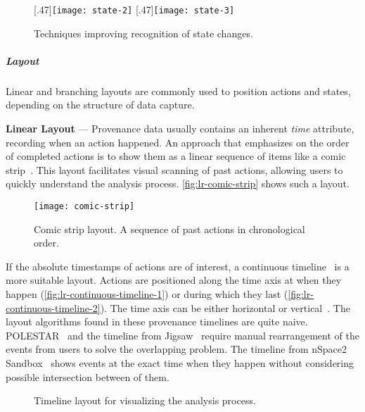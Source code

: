 \begin{figure}[!htb]
\centering
{}[.47\columnwidth]{\texttt{[image: state-2]}} 
\hfill
{}[.47\columnwidth]{\texttt{[image: state-3]}}
\caption{Techniques improving recognition of state changes.}
\end{figure}

\subparagraph{Layout} Linear and branching layouts are commonly used to position actions and states, depending on the structure of data capture.

\textbf{Linear Layout} --- Provenance data usually contains an inherent \emph{time} attribute, recording when an action happened. An approach that emphasizes on the order of completed actions is to show them as a linear sequence of items like a comic strip~\cite{Kurlander1988,Meng1998}. This layout facilitates visual scanning of past actions, allowing users to quickly understand the analysis process. \autoref{fig:lr-comic-strip} shows such a layout.

\begin{figure}[!htb]
	\centering
	\texttt{[image: comic-strip]}
	\caption{Comic strip layout. A sequence of past actions in chronological order. }
	\label{fig:lr-comic-strip}
\end{figure}

If the absolute timestamps of actions are of interest, a continuous timeline~\cite{Derthick2001} is a more suitable layout. Actions are positioned along the time axis at when they happen (\autoref{fig:lr-continuous-timeline-1}) or during which they last (\autoref{fig:lr-continuous-timeline-2}). The time axis can be either horizontal or vertical~\cite{SandboxTimeline2012}. The layout algorithms found in these provenance timelines are quite naive. POLESTAR~\cite{Pioch2006} and the timeline from Jigsaw~\cite{Liu2010} require manual rearrangement of the events from users to solve the overlapping problem. The timeline from nSpace2 Sandbox~\cite{SandboxTimeline2012} shows events at the exact time when they happen without considering possible intersection between of them.

\begin{figure}[!htb]
\centering
{}

\vspace{.5\baselineskip}

\caption{Timeline layout for visualizing the analysis process.}
\end{figure}

